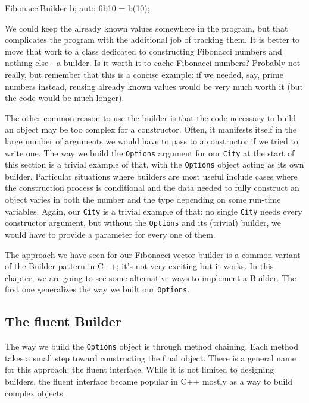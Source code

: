 \begin{code}
FibonacciBuilder b;
auto fib10 = b(10);
\end{code}

We could keep the already known values somewhere in the program, but that complicates the program with the additional job of tracking them. It is better to move that work to a class dedicated to constructing Fibonacci numbers and nothing else - a builder. Is it worth it to cache Fibonacci numbers? Probably not really, but remember that this is a concise example: if we needed, say, prime numbers instead, reusing already known values would be very much worth it (but the code would be much longer).

The other common reason to use the builder is that the code necessary to build an object may be too complex for a constructor. Often, it manifests itself in the large number of arguments we would have to pass to a constructor if we tried to write one. The way we build the \texttt{Options} argument for our \texttt{City} at the start of this section is a trivial example of that, with the \texttt{Options} object acting as its own builder. Particular situations where builders are most useful include cases where the construction process is conditional and the data needed to fully construct an object varies in both the number and the type depending on some run-time variables. Again, our \texttt{City} is a trivial example of that: no single \texttt{City} needs every constructor argument, but without the \texttt{Options} and its (trivial) builder, we would have to provide a parameter for every one of them.

The approach we have seen for our Fibonacci vector builder is a common variant of the Builder pattern in C++; it's not very exciting but it works. In this chapter, we are going to see some alternative ways to implement a Builder. The first one generalizes the way we built our \texttt{Options}.

\subsection{The fluent Builder}

The way we build the \texttt{Options} object is through method chaining. Each method takes a small step toward constructing the final object. There is a general name for this approach: the fluent interface. While it is not limited to designing builders, the fluent interface became popular in C++ mostly as a way to build complex objects.

